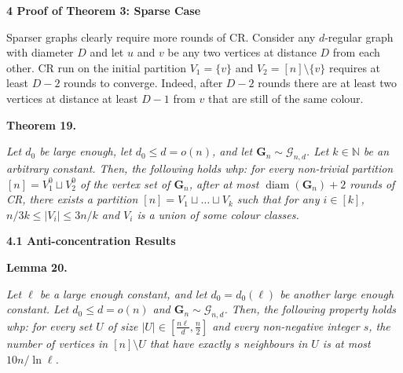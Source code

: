 \par\medskip\noindent\textbf{
4 Proof of Theorem 3: Sparse Case}\par




Sparser graphs clearly require more rounds of CR. Consider any $d$-regular graph with diameter $D$ and let $u$ and $v$ be any two vertices at distance $D$ from each other. CR run on the initial partition $V_{1}=\{v\}$ and $V_{2}=[n]\setminus\{v\}$ requires at least $D-2$ rounds to converge. Indeed, after $D-2$ rounds there are at least two vertices at distance at least $D-1$ from $v$ that are still of the same colour.\par





\par\medskip\noindent\textbf{
\textbf{Theorem 19}\textbf{.}
}\par



\emph{Let $d_{0}$ be large enough, let $d_{0}\leq d=o(n)$, and let $\mathbf{G}_{n}\sim\mathcal{G}_{n,d}$. Let $k\in\mathbb{N}$ be an arbitrary constant. Then, the following holds whp: for every non-trivial partition $[n]=V_{1}^{0}\sqcup V_{2}^{0}$ of the vertex set of $\mathbf{G}_{n}$, after at most $\operatorname{diam}(\mathbf{G}_{n})+2$ rounds of CR, there exists a partition $[n]=V_{1}\sqcup\ldots\sqcup V_{k}$ such that for any $i\in[k]$, $n/3k\leq|V_{i}|\leq 3n/k$ and $V_{i}$ is a union of some colour classes.}\par






\par\medskip\noindent\textbf{
4.1 Anti-concentration Results}\par





\par\medskip\noindent\textbf{
\textbf{Lemma 20}\textbf{.}
}\par



\emph{Let $\ell$ be a large enough constant, and let $d_{0}=d_{0}(\ell)$ be another large enough constant. Let $d_{0}\leq d=o(n)$ and $\mathbf{G}_{n}\sim\mathcal{G}_{n,d}$. Then, the following property holds whp: for every set $U$ of size $|U|\in[\frac{n\ell}{d},\frac{n}{2}]$ and every non-negative integer $s$, the number of vertices in $[n]\setminus U$ that have exactly $s$ neighbours in $U$ is at most $10n/\ln\ell$.}\par



